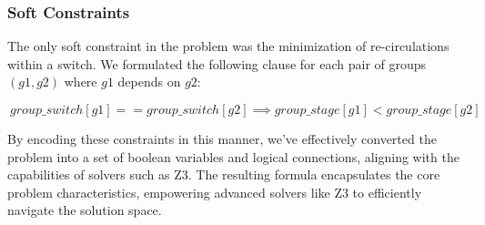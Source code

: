 \subsubsection{Soft Constraints}    

The only soft constraint in the problem was the minimization of re-circulations within a switch. We formulated the following clause for each pair of groups \((g1, g2)\) where \(g1\) depends on \(g2\):
\begin{center}
    \(\ group\_switch[g1] == group\_switch[g2] \implies group\_stage[g1] < group\_stage[g2]  \)
\end{center}

By encoding these constraints in this manner, we've effectively converted the problem into a set of boolean variables and logical connections, aligning with the capabilities of solvers such as Z3. The resulting formula encapsulates the core problem characteristics, empowering advanced solvers like Z3 to efficiently navigate the solution space.